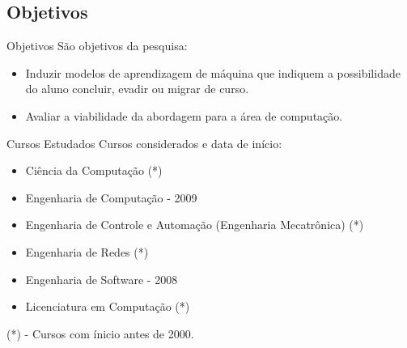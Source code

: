 \subsection{Objetivos}
\begin{frame}{Objetivos}
    São objetivos da pesquisa: 
    \begin{itemize}
        \item Induzir modelos de aprendizagem de máquina que indiquem a possibilidade
            do aluno concluir, evadir ou migrar de curso. 
        \item Avaliar a viabilidade da abordagem para a área de computação.
    \end{itemize}
\end{frame}

\begin{frame}{Cursos Estudados}
    Cursos considerados e data de início: 
    \begin{itemize}
        \item Ciência da Computação (*)
        \item Engenharia de Computação - 2009
        \item Engenharia de Controle e Automação (Engenharia Mecatrônica) (*)
        \item Engenharia de Redes (*)
        \item Engenharia de Software - 2008
        \item Licenciatura em Computação (*)
    \end{itemize}

    \vspace{0.5cm}

    (*) - Cursos com ínicio antes de 2000.
\end{frame}
